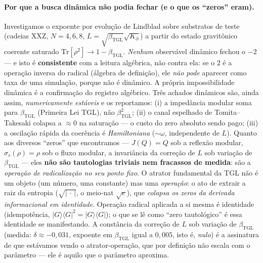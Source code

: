 \documentclass[12pt,a4paper]{article}
\newcommand{\betatgl}{\beta_{\text{TGL}}}
\newcommand{\Kpartial}{K_{\partial}}
\newcommand{\TGL}{\textsc{TGL}}
\begin{document}
\paragraph{Por que a busca dinâmica não podia fechar (e o que os ``zeros'' eram).}
Investigamos o expoente por evolução de Lindblad sobre substratos de teste
(cadeias XXZ, $N = 4, 6, 8$, $L = \sqrt{\betatgl}\sqrt{\Kpartial}$) a partir do
estado gravitônico coerente saturado $\mathrm{Tr}[\rho^{2}] \to 1-\betatgl$.
\emph{Nenhum} observável dinâmico fechou o $-2$ --- e isto é \textbf{consistente}
com a leitura algébrica, não contra ela: se o $2$ é a operação inversa do radical
(álgebra de definição), ele \emph{não pode} aparecer como taxa de uma simulação,
porque não é dinâmico.  A própria impossibilidade dinâmica é a confirmação do
registro algébrico.  Três achados dinâmicos são, ainda assim,
\emph{numericamente estáveis} e os reportamos: (i) a impedância modular soma para
$\betatgl$ (Primeira Lei \TGL{}), não $\betatgl^{2}$; (ii) o canal espelhado de
Tomita--Takesaki colapsa a $\approx 0$ na saturação --- o custo do zero absoluto
sendo pago; (iii) a oscilação rápida da coerência é \emph{Hamiltoniana}
($\sim\omega$, independente de $L$).  Quanto aos diversos ``zeros'' que
encontramos --- $J(Q)=Q$ sob a reflexão modular, $\sigma_{s}(\rho)=\rho$ sob o
fluxo modular, a invariância da correção de $L$ sob variação de $\betatgl$ ---
eles \textbf{não são tautologias triviais nem fracassos de medida}: são a
\emph{operação de radicalização no seu ponto fixo}.  O atrator fundamental da
\TGL{} não é um objeto (um número, uma constante) mas uma \emph{operação}: o ato
de extrair a raiz da entropia ($\sqrt{|\,\cdot\,|}$, o meio-nat $\sqrt{e}$), que
\emph{colapsa os zeros da derivada informacional em identidade}.  Operação radical
aplicada a si mesma é identidade (idempotência, $|G\rangle\langle G|^{2} =
|G\rangle\langle G|$); o que se lê como ``zero tautológico'' é essa identidade se
manifestando.  A constância da correção de $L$ sob variação de $\betatgl$
(medida: $\delta \approx -0{,}031$, expoente em $\betatgl$ igual a $0{,}005$, isto
é, \emph{nulo}) é a assinatura de que estávamos vendo o atrator-operação, que por
definição não escala com o parâmetro --- ele é aquilo que o parâmetro aproxima.
\end{document}
